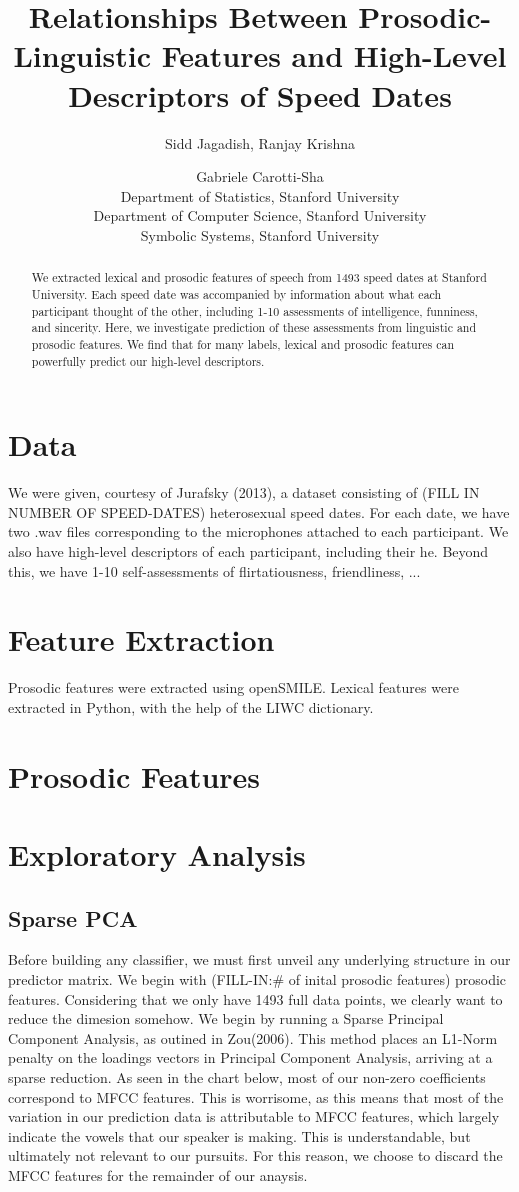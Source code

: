 \documentclass[11pt]{article}
\title{Relationships Between Prosodic-Linguistic Features and High-Level Descriptors of Speed Dates}
\author{Sidd Jagadish,  Ranjay Krishna\and Gabriele Carotti-Sha\\
Department of Statistics, Stanford University\\
Department of Computer Science, Stanford University \\
Symbolic Systems, Stanford University
}
\begin{document}
\maketitle

\begin{abstract}
We extracted lexical and prosodic features of speech from 1493 speed dates at Stanford University.  Each speed date was accompanied by information about what each participant thought of the other, including 1-10 assessments of intelligence, funniness, and sincerity.  Here, we investigate prediction of these assessments from linguistic and prosodic features.  We find that for many labels, lexical and prosodic features can powerfully predict our high-level descriptors.
\end{abstract}

\section{Data}
We were given, courtesy of Jurafsky (2013), a dataset consisting of (FILL IN NUMBER OF SPEED-DATES) heterosexual speed dates. For each date, we have two .wav files corresponding to the microphones attached to each participant.  We also have high-level descriptors of each participant, including their he.  Beyond this, we have 1-10 self-assessments of flirtatiousness, friendliness, ...

\section{Feature Extraction}
Prosodic features were extracted using openSMILE.  Lexical features were extracted in Python, with the help of the LIWC dictionary.  

\section{Prosodic Features}
 
\section{Exploratory Analysis}
\subsection{Sparse PCA}
Before building any classifier, we must first unveil any underlying structure in our predictor matrix.  We begin with (FILL-IN:\# of inital prosodic features) prosodic features.  Considering that we only have 1493 full data points, we clearly want to reduce the dimesion somehow.  We begin by running a Sparse Principal Component Analysis, as outined in Zou(2006).  This method places an L1-Norm penalty on the loadings vectors in Principal Component Analysis, arriving at a sparse reduction.  As seen in the chart below, most of our non-zero coefficients correspond to MFCC features.  This is worrisome, as this means that most of the variation in our prediction data is attributable to MFCC features, which largely indicate the vowels that our speaker is making.  This is understandable, but ultimately not relevant to our pursuits.  For this reason, we choose to discard the MFCC features for the remainder of our anaysis.
\end{document}
